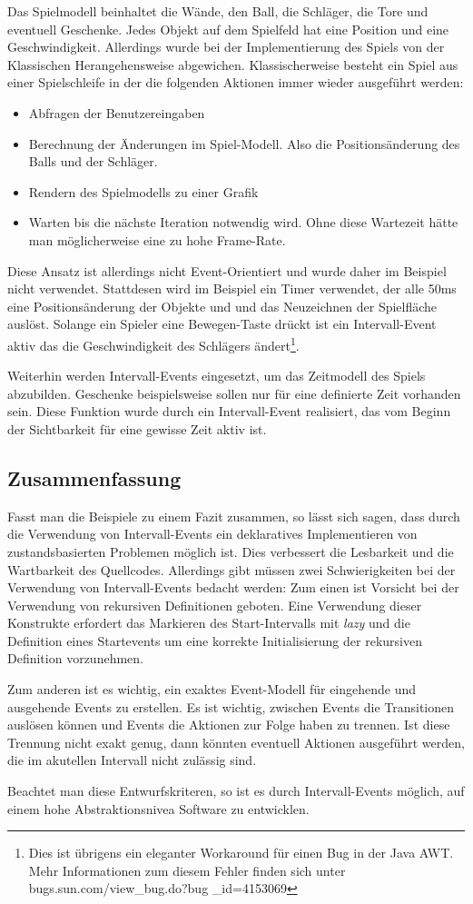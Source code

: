 Das Spielmodell beinhaltet die Wände, den Ball, die Schläger, die Tore und
eventuell Geschenke. Jedes Objekt auf dem Spielfeld hat eine Position und eine
Geschwindigkeit. Allerdings wurde bei der Implementierung des Spiels von der
Klassischen Herangehensweise abgewichen. Klassischerweise besteht ein Spiel aus
einer Spielschleife in der die folgenden Aktionen immer wieder ausgeführt
werden:
\begin{itemize}
  \item Abfragen der Benutzereingaben
  \item Berechnung der Änderungen im Spiel-Modell. Also die Positionsänderung
  des Balls und der Schläger.
  \item Rendern des Spielmodells zu einer Grafik
  \item Warten bis die nächste Iteration notwendig wird. Ohne diese Wartezeit
  hätte man möglicherweise eine zu hohe Frame-Rate.
\end{itemize}

Diese Ansatz ist allerdings nicht Event-Orientiert und wurde daher im Beispiel
nicht verwendet. Stattdesen wird im Beispiel ein Timer verwendet, der alle 50ms
eine Positionsänderung der Objekte und und das Neuzeichnen der Spielfläche auslöst.
Solange ein Spieler eine Bewegen-Taste drückt ist ein Intervall-Event aktiv das
die Geschwindigkeit des Schlägers ändert\footnote{Dies ist übrigens ein
eleganter Workaround für einen Bug in der Java AWT. Mehr Informationen zum
diesem Fehler finden sich unter
bugs.sun.com/view\_bug.do?bug \_id=4153069}.

Weiterhin werden Intervall-Events eingesetzt, um das Zeitmodell des Spiels
abzubilden. Geschenke beispielsweise sollen nur für eine definierte Zeit
vorhanden sein. Diese Funktion wurde durch ein Intervall-Event realisiert, das
vom Beginn der Sichtbarkeit für eine gewisse Zeit aktiv ist. 

\subsection{Zusammenfassung}
Fasst man die Beispiele zu einem Fazit zusammen, so lässt sich sagen, dass durch
die Verwendung von Intervall-Events ein deklaratives Implementieren von
zustandsbasierten Problemen möglich ist. Dies verbessert die Lesbarkeit und die
Wartbarkeit des Quellcodes. Allerdings gibt müssen zwei Schwierigkeiten bei der
Verwendung von Intervall-Events bedacht werden: Zum einen ist Vorsicht bei der
Verwendung von rekursiven Definitionen geboten. Eine Verwendung dieser
Konstrukte erfordert das Markieren des Start-Intervalls mit \textit{lazy} und
die Definition eines Startevents um eine korrekte Initialisierung der rekursiven
Definition vorzunehmen.

Zum anderen ist es wichtig, ein exaktes Event-Modell für eingehende und
ausgehende Events zu erstellen. Es ist wichtig, zwischen Events die Transitionen
auslösen können und Events die Aktionen zur Folge haben zu trennen. Ist diese
Trennung nicht exakt genug, dann könnten eventuell Aktionen ausgeführt werden,
die im akutellen Intervall nicht zulässig sind. 

Beachtet man diese Entwurfskriteren, so ist es durch Intervall-Events möglich,
auf einem hohe Abstraktionsnivea Software zu entwicklen. 

